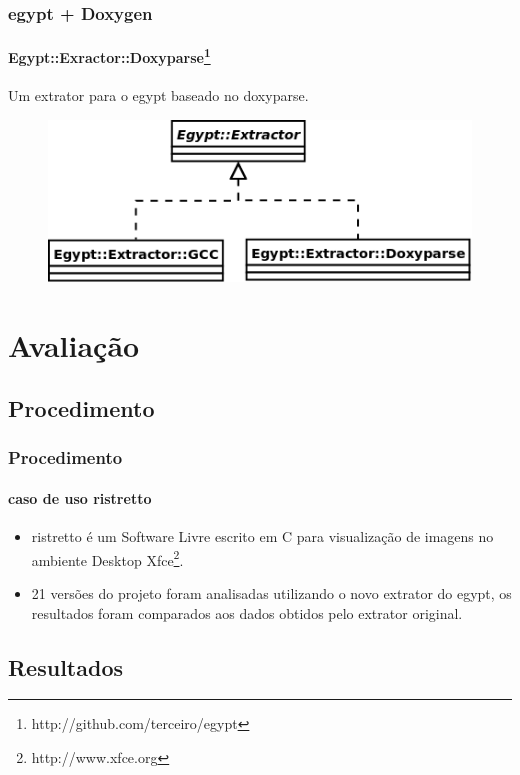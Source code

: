 \documentclass{beamer}
\begin{document}
\begin{frame}
\frametitle{egypt + Doxygen}
\framesubtitle{Egypt::Exractor::Doxyparse\footnote{http://github.com/terceiro/egypt}}
 Um extrator para o egypt baseado no doxyparse.
 \begin{figure}[h]
 \center
 \includegraphics[scale=0.3]{imagens/egypt-diagram-extractor}
 \label{egypt-diagram-extractor}
 \end{figure}
\end{frame}

\section{Avaliação}

\subsection{Procedimento}

\begin{frame}
\frametitle{Procedimento}
\framesubtitle{caso de uso ristretto}
\begin{itemize}
 \item ristretto é um Software Livre escrito em C para visualização de imagens no
 ambiente Desktop Xfce\footnote{http://www.xfce.org}.
 \item 21 versões do projeto foram analisadas utilizando o novo extrator do egypt,
 os resultados foram comparados aos dados obtidos pelo extrator original.
\end{itemize}
\end{frame}

\subsection{Resultados}
\end{document}

